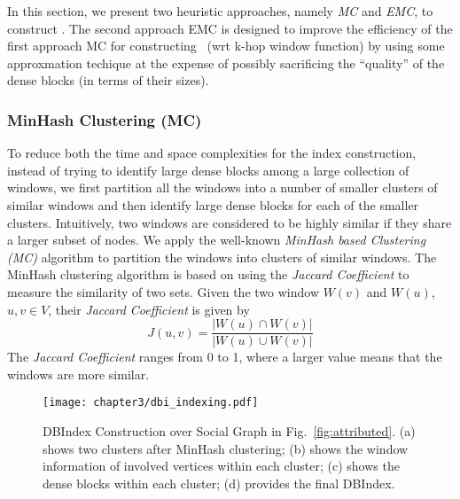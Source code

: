 In this section, we present two heuristic approaches, namely {\it MC} and {\it EMC}, to construct \DBIndex.
The second approach EMC is designed to improve the efficiency of the first approach MC for constructing \DBIndex\
(wrt k-hop window function) by using some approxmation techique at the expense of possibly sacrificing 
the ``quality'' of the dense blocks (in terms of their sizes).

\subsubsection{MinHash Clustering (MC)}

To reduce both the time and space complexities for the index construction,
instead of trying to identify large dense blocks among a large collection of windows,
we first partition all the windows 
into a number of smaller clusters of similar windows and then identify large dense blocks for each of the smaller clusters.
Intuitively, two windows are considered to be highly similar if they share a larger subset of nodes.
We apply the well-known {\it MinHash based Clustering (MC)} algorithm \cite{broder1997syntactic} to partition the windows into clusters of similar windows.
The MinHash clustering algorithm is based on using the
\emph{Jaccard Coefficient} to measure the similarity of two sets.  
Given the two window $W(v)$ and $W(u)$, $u,v \in V$,
their \emph{Jaccard Coefficient} is given by
\begin{equation} \label{eq:jacc_sim}
	J(u,v) = \frac{|W(u) \cap W(v)|}{|W(u) \cup W(v)|}
\end{equation}
The \emph{Jaccard Coefficient} ranges from 0 to 1, where  a larger value means that the windows are more similar.

\begin{figure}[htb]
\centering
\texttt{[image: chapter3/dbi\_indexing.pdf]}
\caption{DBIndex Construction over Social Graph in Fig.~\ref{fig:attributed}. (a) shows two clusters after MinHash clustering; (b) shows the window information of involved vertices within each cluster; (c) shows the dense blocks within each cluster; (d) provides the final DBIndex.}
\label{fig:dbi-indexing}
\end{figure}


